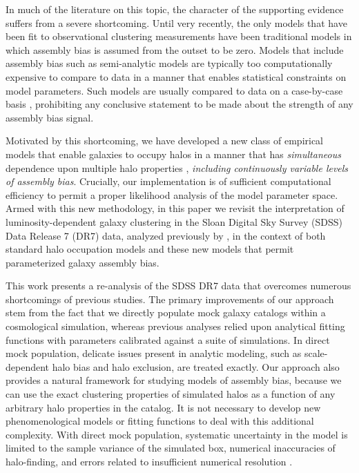 \documentclass[usenatbib,usegraphicx,letterpaper]{mn2e}
\begin{document}
In much of the literature on this topic,
the character of the supporting evidence
suffers from a severe shortcoming.
Until very recently, the only models that have been fit to
observational clustering measurements have been traditional models
in which assembly bias is assumed from the outset to be zero.
Models that include assembly bias such as semi-analytic models
are typically too computationally expensive to compare to data in a manner 
that enables statistical constraints on model parameters. Such models are usually 
compared to data on a case-by-case basis \citep[e.g.,][]{croton_etal07}, prohibiting
any conclusive statement to be made about the strength of any assembly bias signal.


Motivated by this shortcoming, we have developed a new class of
empirical models that enable galaxies to occupy halos in a manner
that has {\em simultaneous} dependence
upon multiple halo properties \citep{hearin_etal16},
{\em including continuously variable levels of assembly bias}.
Crucially, our implementation is of sufficient computational efficiency
to permit a proper likelihood analysis of the model parameter space.
Armed with this new methodology, in this paper
we revisit the interpretation of luminosity-dependent
galaxy clustering in the Sloan Digital Sky Survey (SDSS) Data Release
7 (DR7) data, analyzed previously by \citet{zehavi_etal11}, in the
context of both standard halo occupation models and these new models 
that permit parameterized galaxy assembly bias.


This work presents a re-analysis of the SDSS DR7 data that
overcomes numerous shortcomings of previous studies.
The primary improvements of our approach stem from the fact that we 
directly populate mock galaxy catalogs within a cosmological simulation,
whereas previous analyses relied upon analytical fitting functions
with parameters calibrated against a suite of simulations. 
In direct mock population, delicate issues present in analytic
modeling, such as scale-dependent halo bias and halo exclusion, 
are treated exactly. 
Our approach also provides a natural framework for studying 
models of assembly bias, because we can use the exact clustering 
properties of simulated halos as a function of
any arbitrary halo properties in the catalog. It is not necessary to develop 
new phenomenological models or fitting functions to deal with this additional 
complexity. With direct mock population, systematic uncertainty in the 
model is limited to the sample variance of the simulated box,
numerical inaccuracies of halo-finding, and errors related 
to insufficient numerical resolution \citep[e.g., overmerging; ][]{klypin99a,rockstar}.
\end{document}
